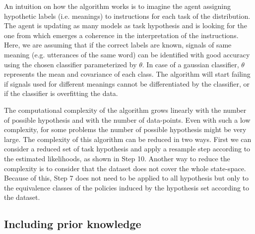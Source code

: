 An intuition on how the algorithm works is to imagine the agent assigning hypothetic labels (i.e. meanings) to instructions for each task of the distribution. The agent is updating as many models as task hypothesis and is looking for the one from which emerges a coherence in the interpretation of the instructions. Here, we are assuming that if the correct labels are known, signals of same meaning (e.g. utterances of the same word) can be identified with good accuracy using the chosen classifier parameterized by $\theta$. %
In case of a gaussian classifier, $\theta$ represents the mean and covariance of each class. The algorithm will start failing if signals used for different meanings cannot be differentiated by the classifier, or if the classifier is overfitting the data.


The computational complexity of the algorithm grows linearly with the number of possible hypothesis and with the number of data-points. Even with such a low complexity, for some problems the number of possible hypothesis might be very large. The complexity of this algorithm can be reduced in two ways. First we can consider a reduced set of task hypothesis and apply a resample step according to the estimated likelihoods, as shown in Step 10. Another way to reduce the complexity is to consider that the dataset does not cover the whole state-space. Because of this, Step 7 does not need to be applied to all hypothesis but only to the equivalence classes of the policies induced by the hypothesis set according to the dataset.

\subsection{Including prior knowledge}


